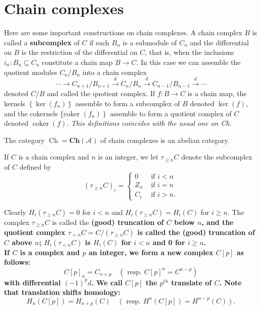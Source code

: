 \section{Chain complexes}

Here are some important constructions on chain complexes. A chain complex $B$ is called a \textbf{subcomplex} of $C$ if each $B_n$ is a submodule of $C_n$ and the differential on $B$ is the restriction of the differential on $C$, that is, when the inclusions $i_n: B_n \subseteq C_n$ constitute a chain map $B \rightarrow C$. In this case we can assemble the quotient modules $C_n / B_n$ into a chain complex
$$
\cdots \rightarrow C_{n+1} / B_{n+1} \xrightarrow{d} C_n / B_n \xrightarrow{d} C_{n-1} / B_{n-1} \xrightarrow{d} \cdots
$$
denoted $C / B$ and called the quotient complex. If $f: B \rightarrow C$ is a chain map, the kernels $\left\{\operatorname{ker}\left(f_n\right)\right\}$ assemble to form a subcomplex of $B$ denoted $\operatorname{ker}(f)$, and the cokernels \{coker $\left.\left(f_n\right)\right\}$ assemble to form a quotient complex of $C$ denoted $\operatorname{coker}(f)$. \textit{This definitions coincides with the usual one on Ch}.\\

\begin{theo}
The category $\operatorname{Ch}=\mathbf{C h}(\mathcal{A})$ of chain complexes is an abelian category.   
\end{theo}

If $C$ is a chain complex and $n$ is an integer, we let $\tau_{\geq n} C$ denote the subcomplex of $C$ defined by
$$
\left(\tau_{\geq n} C\right)_i= \begin{cases}0 & \text { if } i<n \\ Z_n & \text { if } i=n \\ C_i & \text { if } i>n .\end{cases}
$$

Clearly $H_i\left(\tau_{\geq n} C\right)=0$ for $i<n$ and $H_i\left(\tau_{\geq n} C\right)=H_i(C)$ for $i \geq n$. The complex $\tau_{\geq n} C$ is called the \bf{(good) truncation of $C$ below $n$}, and the quotient complex $\tau_{<n} C=C /\left(\tau_{\geq n} C\right)$ is called the \bf{(good) truncation of $C$ above $n$}; $H_i\left(\tau_{<n} C\right)$ is $H_i(C)$ for $i<n$ and 0 for $i \geq n$.\\

If $C$ is a complex and $p$ an integer, we form a new complex $C[p]$ as follows:
$$
C[p]_n=C_{n+p} \quad\left(\text { resp. } C[p]^n=C^{n-p}\right)
$$
with differential $(-1)^p d$. We call $C[p]$ the $p^{t h}$ translate of $C$. Note that translation shifts homology:
$$
H_n(C[p])=H_{n+p}(C) \quad\left(\text { resp. } H^n(C[p])=H^{n-p}(C)\right) .
$$

